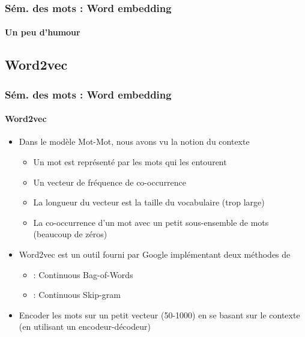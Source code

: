 \documentclass[xcolor=table]{beamer}
\begin{document}
\begin{frame}
\frametitle{Sém. des mots : Word embedding}
\framesubtitle{Un peu d'humour}
\begin{center}
\end{center}
\end{frame}


\subsection{Word2vec}

\begin{frame}
\frametitle{Sém. des mots : Word embedding}
\framesubtitle{Word2vec}

\begin{itemize}
	\item Dans le modèle Mot-Mot, nous avons vu la notion du contexte 
	\begin{itemize}
		\item Un mot est représenté par les mots qui les entourent
		\item Un vecteur de fréquence de co-occurrence
		\item La longueur du vecteur est la taille du vocabulaire (trop large)
		\item La co-occurrence d'un mot avec un petit sous-ensemble de mots (beaucoup de zéros)
	\end{itemize}
	\item Word2vec est un outil fourni par Google implémentant deux méthodes de  \cite{2013-mikolov-al}
	\begin{itemize}
		\item {} : Continuous Bag-of-Words
		\item {} : Continuous Skip-gram
	\end{itemize}
	\item Encoder les mots sur un petit vecteur (50-1000) en se basant sur le contexte (en utilisant un encodeur-décodeur)
\end{itemize}

\end{frame}
\end{document}
